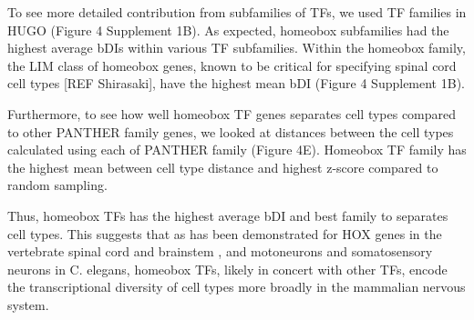 To see more detailed contribution from subfamilies of TFs, we used TF families in HUGO (Figure 4 Supplement 1B). As expected, homeobox subfamilies had the highest average bDIs within various TF subfamilies. Within the homeobox family, the LIM class of homeobox genes, known to be critical for specifying spinal cord cell types [REF Shirasaki], have the highest mean bDI (Figure 4 Supplement 1B). 

Furthermore, to see how well homeobox TF genes separates cell types compared to other PANTHER family genes, we looked at distances between the cell types calculated using each of PANTHER family (Figure 4E). Homeobox TF family has the highest mean between cell type distance and highest z-score compared to random sampling. 

Thus, homeobox TFs has the highest average bDI and best family to separates cell types. This suggests that as has been demonstrated for HOX genes in the vertebrate spinal cord and brainstem \cite{Dasen_2009,Philippidou_2013}, and motoneurons \cite{Kratsios_2017} and somatosensory neurons \cite{Zheng_2015} in C. elegans, homeobox TFs, likely in concert with other TFs, encode the transcriptional diversity of cell types more broadly in the mammalian nervous system.
